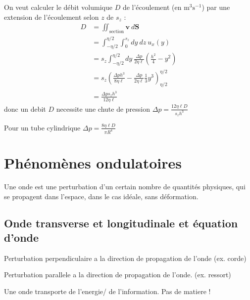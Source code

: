 On veut calculer le débit volumique $D$ de l'écoulement (en $\mathrm{m}^{3}\mathrm{s}^{-1}$) par une extension de l'écoulement selon $z$ de $s _{z}$ :
\begin{align*}
D & =\iint _{\mathrm{section}} \boldsymbol{v}~d\boldsymbol{S} \\
 & =\int _{-\eta /2}^{\eta /2}\int _{0}^{s _{z}} dy~dz~u_{x}(y) \\
 & = s _{z}\int_{-\eta /2}^{\eta /2} dy~ \frac{\Delta p}{2\eta \ell }\left( \frac{h^{2}}{4}-y^{2} \right) \\
 &=s _{z}\left( \frac{\Delta ph^{3}}{8\eta \ell}-\frac{\Delta p}{2\eta \ell} \frac{1}{3} y^{3}  \right)^{\eta /2}_{\eta /2} \\
 & =\frac{\Delta ps _{z} h^{3}}{12\eta \ell} 
\end{align*}
donc un debit $D$ necessite une chute de pression $\Delta p=\frac{12\eta \ell D}{s _{z} h^{3}}$
\begin{remark}
Pour un tube cylindrique $\Delta p=\frac{8\eta \ell D}{\pi R^{4}}$
\end{remark}



\chapter{Phénomènes ondulatoires}

\begin{definition}
Une onde est une perturbation d'un certain nombre de quantités physiques, qui se propagent dans l'espace, dans le cas idéale, sans déformation.
\end{definition}

\section{Onde transverse et longitudinale et équation d'onde}

\begin{definition}
Perturbation perpendiculaire a la direction de propagation de l'onde (ex. corde)
\end{definition}
\begin{definition}
Perturbation parallele a la direction de propagation de l'onde. (ex. ressort)
\end{definition}
\begin{remark}
Une onde transporte de l'energie/ de l'information. Pas de matiere !
\end{remark}

